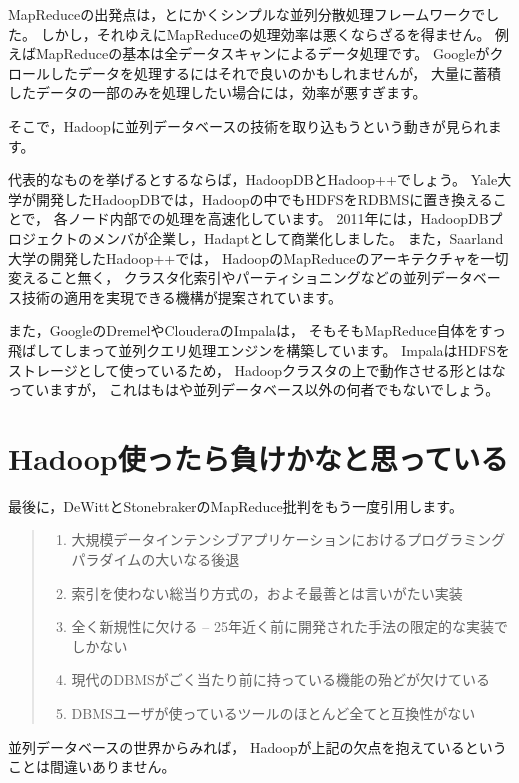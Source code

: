 MapReduceの出発点は，とにかくシンプルな並列分散処理フレームワークでした。
しかし，それゆえにMapReduceの処理効率は悪くならざるを得ません。
例えばMapReduceの基本は全データスキャンによるデータ処理です。
Googleがクロールしたデータを処理するにはそれで良いのかもしれませんが，
大量に蓄積したデータの一部のみを処理したい場合には，効率が悪すぎます。

そこで，Hadoopに並列データベースの技術を取り込もうという動きが見られます。

代表的なものを挙げるとするならば，HadoopDBとHadoop++でしょう。
Yale大学が開発したHadoopDBでは，Hadoopの中でもHDFSをRDBMSに置き換えることで，
各ノード内部での処理を高速化しています。
2011年には，HadoopDBプロジェクトのメンバが企業し，Hadaptとして商業化しました。
また，Saarland大学の開発したHadoop++では，
HadoopのMapReduceのアーキテクチャを一切変えること無く，
クラスタ化索引やパーティショニングなどの並列データベース技術の適用を実現できる機構が提案されています。

また，GoogleのDremelやClouderaのImpalaは，
そもそもMapReduce自体をすっ飛ばしてしまって並列クエリ処理エンジンを構築しています。
ImpalaはHDFSをストレージとして使っているため，
Hadoopクラスタの上で動作させる形とはなっていますが，
これはもはや並列データベース以外の何者でもないでしょう。

\section{Hadoop使ったら負けかなと思っている}

最後に，DeWittとStonebrakerのMapReduce批判をもう一度引用します。

\begin{quote}
\begin{enumerate}
 \item 大規模データインテンシブアプリケーションにおけるプログラミングパラダイムの大いなる後退
 \item 索引を使わない総当り方式の，およそ最善とは言いがたい実装
 \item 全く新規性に欠ける -- 25年近く前に開発された手法の限定的な実装でしかない
 \item 現代のDBMSがごく当たり前に持っている機能の殆どが欠けている
 \item DBMSユーザが使っているツールのほとんど全てと互換性がない
\end{enumerate}
\end{quote}

並列データベースの世界からみれば，
Hadoopが上記の欠点を抱えているということは間違いありません。

